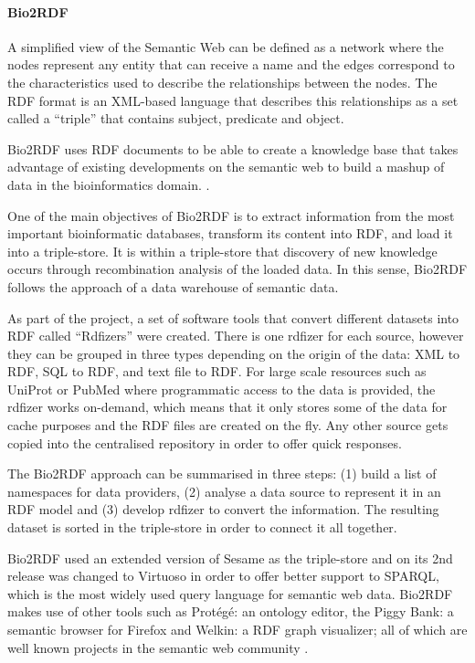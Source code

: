 \paragraph{Bio2RDF}
A simplified view of the Semantic Web can be defined as a network where the nodes represent any entity that can receive a name and the edges correspond to the characteristics used to describe the relationships between the nodes. The RDF format is an XML-based language that describes this relationships as a set called a ``triple'' that contains subject, predicate and object.

Bio2RDF uses RDF documents to be able to create a knowledge base that takes advantage of existing developments on the semantic web to build a mashup of data in the bioinformatics domain.  \cite{BEL2008}.

One of the main objectives of Bio2RDF is to extract information from the most important bioinformatic databases, transform its content into RDF, and load it into a triple-store. It is within a triple-store that discovery of new knowledge occurs through recombination analysis of the loaded data. In this sense, Bio2RDF follows the approach of a data warehouse of semantic data.

As part of the project, a set of software tools that convert different datasets into RDF called ``Rdfizers'' were created. There is one rdfizer for each source, however they can be grouped in three types depending on the origin of the data: XML to RDF, SQL to RDF, and text file to RDF. For large scale resources such as UniProt or PubMed where programmatic access to the data is provided, the rdfizer works on-demand, which means that it only stores some of the data for cache purposes and the RDF files are created on the fly. Any other source gets copied into the centralised repository in order to offer quick responses.

The Bio2RDF approach can be summarised in three steps: (1) build a list of namespaces for data providers, (2) analyse a data source to represent it in an RDF model and (3) develop rdfizer to convert the information. The resulting dataset is sorted in the triple-store in order to connect it all together.

Bio2RDF used an extended version of Sesame as the triple-store and on its 2nd release was changed to Virtuoso in order to offer better support to SPARQL, which is the most widely used query language for semantic web data. Bio2RDF makes use of other tools such as Protégé: an ontology editor, the Piggy Bank: a semantic browser for Firefox and Welkin: a RDF graph visualizer; all of which are well known projects in the semantic web community \cite{BEL2008}.

